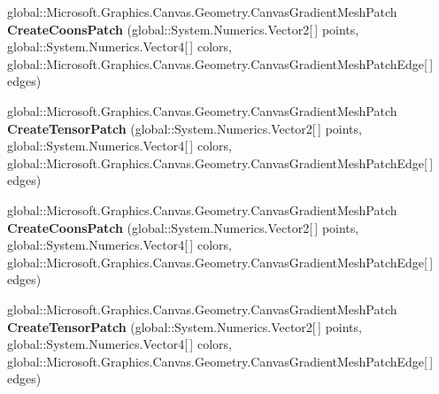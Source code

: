 \begin{DoxyCompactItemize}
global\+::\+Microsoft.\+Graphics.\+Canvas.\+Geometry.\+Canvas\+Gradient\+Mesh\+Patch {\bfseries Create\+Coons\+Patch} (global\+::\+System.\+Numerics.\+Vector2\mbox{[}$\,$\mbox{]} points, global\+::\+System.\+Numerics.\+Vector4\mbox{[}$\,$\mbox{]} colors, global\+::\+Microsoft.\+Graphics.\+Canvas.\+Geometry.\+Canvas\+Gradient\+Mesh\+Patch\+Edge\mbox{[}$\,$\mbox{]} edges)
\item 
\mbox{\label{interface_microsoft_1_1_graphics_1_1_canvas_1_1_geometry_1_1_i_canvas_gradient_mesh_statics_a128a934c6dc2b5cb9ae41b70720dedaf}} 
global\+::\+Microsoft.\+Graphics.\+Canvas.\+Geometry.\+Canvas\+Gradient\+Mesh\+Patch {\bfseries Create\+Tensor\+Patch} (global\+::\+System.\+Numerics.\+Vector2\mbox{[}$\,$\mbox{]} points, global\+::\+System.\+Numerics.\+Vector4\mbox{[}$\,$\mbox{]} colors, global\+::\+Microsoft.\+Graphics.\+Canvas.\+Geometry.\+Canvas\+Gradient\+Mesh\+Patch\+Edge\mbox{[}$\,$\mbox{]} edges)
\item 
\mbox{\label{interface_microsoft_1_1_graphics_1_1_canvas_1_1_geometry_1_1_i_canvas_gradient_mesh_statics_ae8992067a301a411c734f0e902fb4a18}} 
global\+::\+Microsoft.\+Graphics.\+Canvas.\+Geometry.\+Canvas\+Gradient\+Mesh\+Patch {\bfseries Create\+Coons\+Patch} (global\+::\+System.\+Numerics.\+Vector2\mbox{[}$\,$\mbox{]} points, global\+::\+System.\+Numerics.\+Vector4\mbox{[}$\,$\mbox{]} colors, global\+::\+Microsoft.\+Graphics.\+Canvas.\+Geometry.\+Canvas\+Gradient\+Mesh\+Patch\+Edge\mbox{[}$\,$\mbox{]} edges)
\item 
\mbox{\label{interface_microsoft_1_1_graphics_1_1_canvas_1_1_geometry_1_1_i_canvas_gradient_mesh_statics_a128a934c6dc2b5cb9ae41b70720dedaf}} 
global\+::\+Microsoft.\+Graphics.\+Canvas.\+Geometry.\+Canvas\+Gradient\+Mesh\+Patch {\bfseries Create\+Tensor\+Patch} (global\+::\+System.\+Numerics.\+Vector2\mbox{[}$\,$\mbox{]} points, global\+::\+System.\+Numerics.\+Vector4\mbox{[}$\,$\mbox{]} colors, global\+::\+Microsoft.\+Graphics.\+Canvas.\+Geometry.\+Canvas\+Gradient\+Mesh\+Patch\+Edge\mbox{[}$\,$\mbox{]} edges)
\item 
\mbox{\label{interface_microsoft_1_1_graphics_1_1_canvas_1_1_geometry_1_1_i_canvas_gradient_mesh_statics_ae8992067a301a411c734f0e902fb4a18}} 

\end{DoxyCompactItemize}
